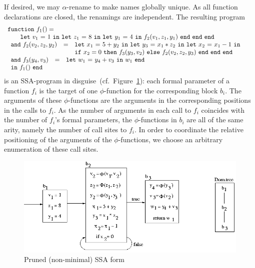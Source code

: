 If desired, we may $\alpha$-rename to make names globally unique. As
all function declarations are closed, the renamings are independent.
The resulting program
\begin{equation}
\label{FunctionalConstructionProgram2}
\begin{array}{l}
  \mathtt{function}\ f_1() = \\ \qquad
   \letin {v_1} 1 {
              \letin {z_1} 8 {
                 \letin {y_1} 4 {\call {f_2} {v_1,z_1,y_1}}
              }
            }
\\
\begin{array}{lcl}
\mathtt{and}\ f_2(v_2,z_2,y_2) & = & 
  \letinD {x_1} {5+y_2} {
              \letinD {y_3} {x_1*z_2} {
                 \letinD {x_2} {x_1-1} {}}}\\ & & 
   \ite {x_2=0} {\call {f_3} {y_3,v_2}} 
              {\call {f_2} {v_2,z_2,y_3}}\ \mathtt{end}\ \mathtt{end}\ \mathtt{end}
\end{array}\\
\begin{array}{lcl}
  \mathtt{and}\ f_3(y_4,v_3) & = & \letin {w_1} {y_4+v_3} {w_1}\\
  \mathtt{in}\ f_1()\ \mathtt{end}
\end{array} 
\end{array}
\end{equation}
is an SSA-program in
disguise~(cf.~Figure~\ref{fig:FunctionalCorrespondenceRunningExampleInitialSSA}):
each formal parameter of a function $f_i$ is the target of one
$\phi$-function for the corresponding block $b_i$. The arguments of
these $\phi$-functions are the arguments in the corresponding
positions in the calls to $f_i$. As the number of arguments in each
call to $f_i$ coincides with the number of $f_i$'s formal parameters,
the $\phi$-functions in $b_i$ are all of the same arity, namely the
number of call sites to $f_i$. In order to coordinate the relative
positioning of the arguments of the $\phi$-functions, we choose an
arbitrary enumeration of these call sites.
\begin{figure}
\begin{center}
\includegraphics[scale=0.6]{SSAConstructionExample2.png}
\end{center}
\caption{\label{fig:FunctionalCorrespondenceRunningExampleInitialSSA} Pruned (non-minimal) SSA form}
\end{figure}

